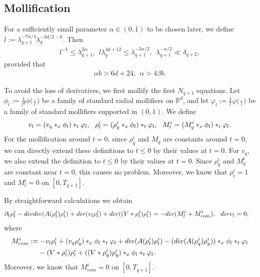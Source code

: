 \documentclass[10pt,a4paper]{amsart}
\numberwithin{equation}{section}
\def\leq{\leqslant}
\def\div{\mathord{{\rm div}}}
\def\leq{\leqslant}
\def\div{\mathord{{\rm div}}}
\begin{document}
\subsection{Mollification}\label{sec:mpll4}
For a sufficiently small parameter $\alpha\in(0,1)$ to be chosen later, we define
$
l:=\lambda_{q+1}^{-7\alpha/4}\lambda_q^{-3d/2-6}.
$
Then
\begin{align}
l^{-1}
\leq
\lambda_{q+1}^{2\alpha},
 \ \
l\lambda_q^{3d+12}
\leq
\lambda_{q+1}^{-3\alpha/2},\ \ \lambda_{q+1}^{-\alpha/2}
\ll
\delta_{q+2},
\label{para42}
\end{align}
provided that
\begin{align}
\alpha b>6d+24,
\ \
\alpha>4\beta b.
\label{alphab>}
\end{align}

To avoid the loss of derivatives, we first mollify the first $N_{q+1}$ equations.
Let
$
\phi_l:=\frac1{l^d}\phi\bigl(\tfrac{\cdot}{l}\bigr)
$
be a family of standard radial mollifiers on $\mathbb{R}^d$, and let
$
\varphi_l:=\frac1l\varphi\bigl(\tfrac{\cdot}{l}\bigr)
$
be a family of standard mollifiers supported in $(0,1)$.
We define  
\begin{align}
v_l=(v_{q }*_x\phi_l)*_t\varphi_l,\ \ 
 \rho_l^i=(\rho_{q}^i*_x\phi_l)*_t\varphi_l,\ \ M_l^i=(M_{q }^i*_x\phi_l)*_t\varphi_l.\notag
\end{align}
  For the mollification around $t = 0$,  since $ \rho_q^i$ and $M_q$ are constants around $t = 0$, we  can directly extend these definitions  to $t\leq 0$ by their values at $t=0$. For $v_q$, we also extend the definition to $t\leq0$ by their values at $t=0$.
Since $\rho_q^i$ and $M_q^i$ are constant near $t=0$, this causes no problem.
Moreover,    we know that $ \rho_l^i=1 $ and $ M_l^i=0$ on $[0, T_{q+1}]$.
  
By straightforward calculations  we obtain 
\begin{align}
\partial_t \rho_l^i-\div\div(A(\rho_l^i)\rho_l^i)+\div(v_l \rho_l^i)+\div((V*\rho_l^i)\rho_l^i)&=-\div (M^i_l+M^i_{com}),\ \ \div v_l=0,\label{eq:4v_l}
\end{align} where
 \begin{align*}
M_{com}^i&:=-v_l \rho^i_l+(v_{q } \rho^i_{q})*_x\phi_l*_t\varphi_l+\div(A(\rho_l^i) \rho_l^i)-(\div(A(\rho_q^i) \rho_q^i))*_x\phi_l*_t\varphi_l\\
&\ \ \ \   -(V*\rho_l^i)\rho_l^i+((V*\rho_q^i)\rho_q^i)*_x\phi_l*_t\varphi_l.
\end{align*} 
 Moreover,    we know that   $ M_{com}^i=0$ on $[0, T_{q+1}]$.
\end{document}
